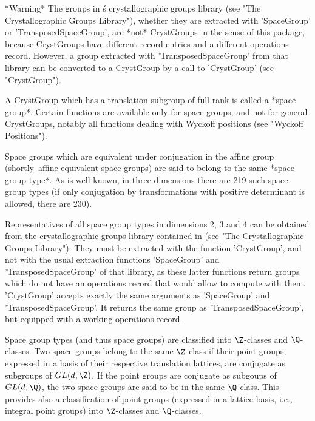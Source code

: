 *Warning\:* The groups in {\GAP}\' s crystallographic groups library (see
"The Crystallographic Groups Library"),  whether they are extracted  with
'SpaceGroup'  or  'TransposedSpaceGroup', are  *not*  CrystGroups in  the
sense of this package,  because CrystGroups have different record entries
and  a  different  operations record.  However,  a group  extracted  with
'TransposedSpaceGroup' from that library can be converted to a CrystGroup
by a call to 'CrystGroup' (see "CrystGroup").


A CrystGroup which has  a translation subgroup of full  rank is called  a
*space group*. Certain functions are available only for space groups, and
not  for general CrystGroups, notably all  functions dealing with Wyckoff
positions (see "Wyckoff Positions").

Space  groups which are equivalent  under conjugation in the affine group
(shortly\:\ affine  equivalent  space groups)  are said  to belong to the
same *space group type*.  As is well known, in three dimensions there are
219 such space group  types (if only  conjugation by transformations with
positive determinant is allowed, there are 230).

Representatives of all space group types in dimensions  2, 3 and 4 can be
obtained from  the  crystallographic groups  library contained in  {\GAP}
(see "The Crystallographic Groups  Library"). They must be extracted with
the  function 'CrystGroup', and  not with the  usual extraction functions
'SpaceGroup' and 'TransposedSpaceGroup'  of that library, as these latter
functions return groups which do not have an operations record that would
allow  to  compute  with  them.  'CrystGroup'  accepts  exactly the  same
arguments as 'SpaceGroup' and 'TransposedSpaceGroup'. It returns the same
group as 'TransposedSpaceGroup', but  equipped with a  working operations
record.

Space   group types   (and  thus  space   groups)   are classified   into
$\Z$-classes and  $\Q$-classes.  Two  space  groups belong   to  the same
$\Z$-class  if  their  point  groups, expressed   in  a   basis of  their
respective   translation   lattices,   are   conjugate  as  subgroups  of
$GL(d,\Z)$. If the point groups are conjugate  as subgoups of $GL(d,\Q)$,
the  two space groups  are  said  to  be  in  the same $\Q$-class.   This
provides also  a classification of point  groups  (expressed in a lattice
basis, i.e., integral point groups) into $\Z$-classes and $\Q$-classes.

